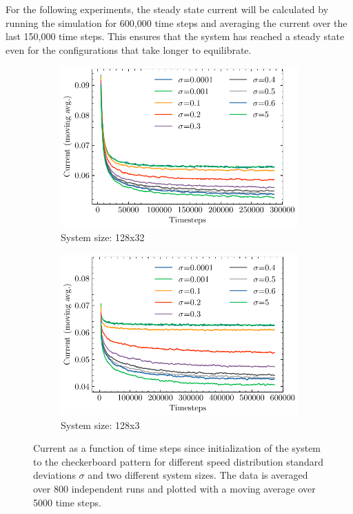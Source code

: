 For the following experiments, the steady state current will be calculated by running the simulation for 600,000 time steps and averaging the current over the last 150,000 time steps. This ensures that the system has reached a steady state even for the configurations that take longer to equilibrate.

\begin{figure}[H]
    \centering
    \begin{subfigure}{\textwidth}
        \centering
        \includegraphics{currents_fixed_sigma_128x32}
        \caption{System size: 128x32}
        \label{fig:currents_fixed_sigma_128x32}
    \end{subfigure}
    \par\vspace{1cm}
    \begin{subfigure}{\textwidth}
        \centering
        \includegraphics{currents_fixed_sigma_128x3}
        \caption{System size: 128x3}
        \label{fig:currents_fixed_sigma_128x3}
    \end{subfigure}
    \caption{Current as a function of time steps since initialization of the system to the checkerboard pattern for different speed distribution standard deviations $\sigma$ and two different system sizes. The data is averaged over 800 independent runs and plotted with a moving average over 5000 time steps.}
\end{figure}


